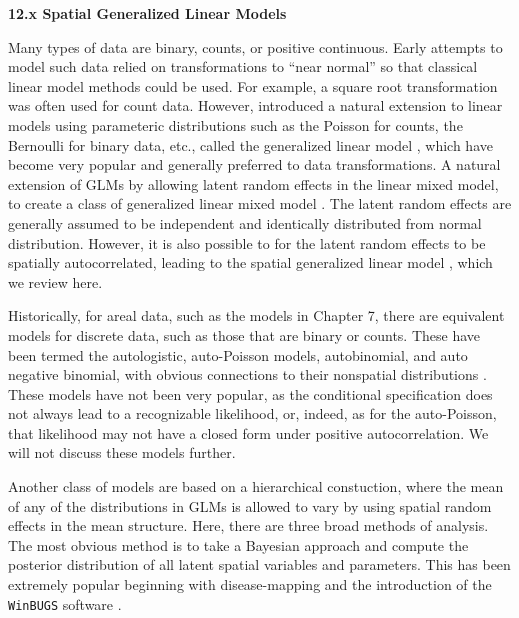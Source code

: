\documentclass[12pt, titlepage]{article}
\begin{document}
\setcounter{equation}{0}
\renewcommand{\theequation}{12.\arabic{equation}}


%
%

{\Large \flushleft \textbf{12.x Spatial Generalized Linear Models}}

\vspace{.3cm}

Many types of data are binary, counts, or positive continuous.  Early attempts to model such data relied on transformations to ``near normal'' so that classical linear model methods could be used.  For example, a square root transformation was often used for count data.  However, \citet{NelderEtAl1972GeneralizedLinearModels370} introduced a natural extension to linear models using parameteric distributions such as the Poisson for counts, the Bernoulli for binary data, etc., called the generalized linear model \citep[GLM,][]{McCullaghEtAl1989GeneralizedLinearModels}, which have become very popular and generally preferred to data transformations.  A natural extension of GLMs by allowing latent random effects in the linear mixed model, to create a class of generalized linear mixed model \citep[GLMM,][]{breslow_approximate_1993}.  The latent random effects are generally assumed to be independent and identically distributed from normal distribution.  However, it is also possible to for the latent random effects to be spatially autocorrelated, leading to the spatial generalized linear model \citep[SGLM,][]{GotwayEtAl1997GeneralizedLinearModel157, DiggleEtAl1998ModelbasedGeostatisticsDisc299}, which we review here.

Historically, for areal data, such as the models in Chapter 7, there are equivalent models for discrete data, such as those that are binary or counts.  These have been termed the autologistic, auto-Poisson models, autobinomial, and auto negative binomial, with obvious connections to their nonspatial distributions \citep{Besag1974SpatialInteractionStatistical192, Cressie1993StatisticsSpatialData}.  These models have not been very popular, as the conditional specification does not always lead to a recognizable likelihood, or, indeed, as for the auto-Poisson, that likelihood may not have a closed form under positive autocorrelation.  We will not discuss these models further.

Another class of models are based on a hierarchical constuction, where the mean of any of the distributions in GLMs is allowed to vary by using spatial random effects in the mean structure.  Here, there are three broad methods of analysis.  The most obvious method is to take a Bayesian approach and compute the posterior distribution of all latent spatial variables and parameters.  This has been extremely popular beginning with disease-mapping \citep{clayton_empirical_1987} and the introduction of the \texttt{WinBUGS} software \citep{lunn_winbugs-bayesian_2000}. 
\end{document}
